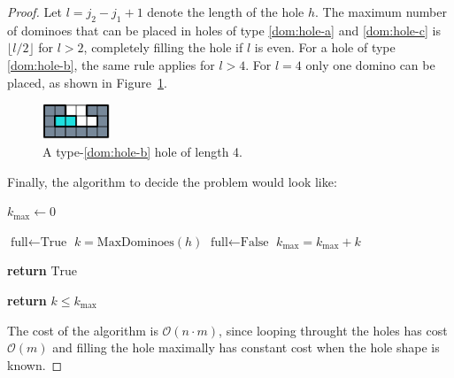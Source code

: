 \begin{proof}
Let \( l = j_2 - j_1 + 1 \) denote the length of the hole \( h \). The maximum number of dominoes that can be placed in holes of type \ref{dom:hole-a} and \ref{dom:hole-c} is \( \lfloor l / 2 \rfloor \) for $l > 2 $, completely filling the hole if \( l \) is even. For a hole of type \ref{dom:hole-b}, the same rule applies for \( l > 4 \). For $l = 4$ only one domino can be placed, as shown in Figure~\ref{dom:hole-4}.

\begin{figure}[h]
    \centering
    \includegraphics[width=0.18\textwidth]{./pictures/dominoes/hole-4.pdf}
    \caption{A type-\ref{dom:hole-b} hole of length 4.}
    \label{dom:hole-4} 
\end{figure}

Finally, the algorithm to decide the problem would look like:
\begin{algorithmic}[1]
     
    \State $k_{\max}\gets 0$ 

    \State $\text{full} \gets \text{True}$
        \State $k = \text{MaxDominoes}(h)$ 
          \State $\text{full} \gets \text{False}$
        \EndIf
        \State $k_{\max} = k_{\max} + k$
      \EndFor

        \State \textbf{return} $\text{True}$ 
    \EndIf
\EndFor

\State \textbf{return} $k \leq k_{\max}$
\EndFunction
\end{algorithmic}

The cost of the algorithm is $\mathcal{O}(n \cdot m)$, since looping throught the holes has cost $\mathcal{O}(m)$ and filling the hole maximally has constant cost when the hole shape is known.

\end{proof}



